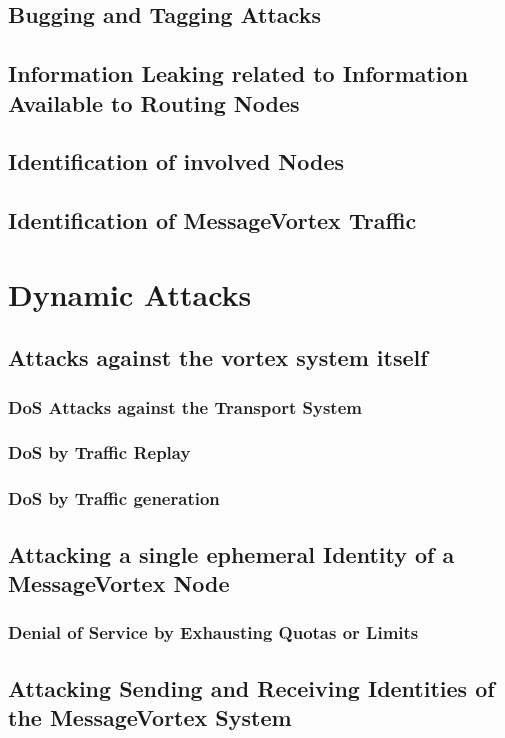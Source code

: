 \subsection{Bugging and Tagging Attacks}
\subsection{Information Leaking related to Information Available to Routing Nodes}
\subsection{Identification of involved Nodes}
\subsection{Identification of MessageVortex Traffic}
\section{Dynamic Attacks}
\subsection{Attacks against the vortex system itself}
\subsubsection{DoS Attacks against the Transport System}
\subsubsection{DoS by Traffic Replay}
\subsubsection{DoS by Traffic generation}
\subsection{Attacking a single ephemeral Identity of a MessageVortex Node}
\subsubsection{Denial of Service by Exhausting Quotas or Limits}
\subsection{Attacking Sending and Receiving Identities of the MessageVortex System}
